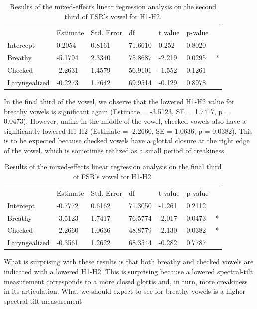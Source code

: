 \documentclass[12pt, letterpaper]{article}
\providecommand{\lsptoprule}{\midrule\toprule}
\providecommand{\lspbottomrule}{\bottomrule\midrule}
\begin{document}
\begin{table}[!h]
    \centering
    \caption{Results of the mixed-effects linear regression analysis on the second third of FSR's vowel for H1-H2. }
    \label{tab:FSR_H1H2_Second}
    \begin{tabular}{lllllll}
	\lsptoprule
					&  Estimate  & Std. Error & df & t value & p-value & \\
        Intercept       &  0.2054   & 0.8161 & 71.6610 & 0.252  & 0.8020  & \\  
  	Breathy   		&  -5.1794  & 2.3340 & 75.8687 & -2.219  &  0.0295 & *\\
	Checked    		&  -2.2631  & 1.4579 & 56.9101 & -1.552  & 0.1261  & \\
	Laryngealized	&  -0.2273  & 1.7642 & 69.9514 & -0.129  &  0.8978 & \\
        \lspbottomrule
    \end{tabular}
\end{table}

In the final third of the vowel, we observe that the lowered H1-H2 value for breathy vowels is significant again (Estimate = -3.5123, SE = 1.7417, p = 0.0473). However, unlike in the middle of the vowel, checked vowels also have a significantly lowered H1-H2 (Estimate = -2.2660, SE = 1.0636, p = 0.0382). This is to be expected because checked vowels have a glottal closure at the right edge of the vowel, which is sometimes realized as a small period of creakiness.

\begin{table}[!h]
    \centering
    \caption{Results of the mixed-effects linear regression analysis on the final third of FSR's vowel for H1-H2. }
    \label{tab:FSR_H1H2_Third}
    \begin{tabular}{lllllll}
	\lsptoprule
					&  Estimate  & Std. Error & df & t value & p-value & \\
        Intercept       &  -0.7772   & 0.6162 & 71.3050 & -1.261  & 0.2112  & \\  
  	Breathy   		&  -3.5123  & 1.7417 & 76.5774 & -2.017  &  0.0473 & *\\
	Checked    		&  -2.2660  & 1.0636 & 48.8779 & -2.130  & 0.0382 & * \\
	Laryngealized	&  -0.3561  & 1.2622 & 68.3544 & -0.282  &  0.7787 & \\
        \lspbottomrule
    \end{tabular}
\end{table}

What is surprising with these results is that both breathy and checked vowels are indicated with a lowered H1-H2. This is surprising because a lowered spectral-tilt measurement corresponds to a more closed glottis and, in turn, more creakiness in its articulation. What we should expect to see for breathy vowels is a higher spectral-tilt measurement
\end{document}
